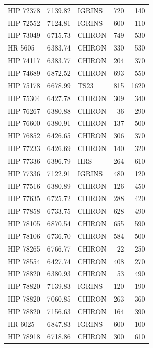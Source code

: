 {\begin{scriptsize}
\begin{longtable}{|l|rlrr|}
   HIP 72378 &  7139.82 &     IGRINS &      720 &   140 \\
   HIP 72552 &  7124.81 &     IGRINS &      600 &   110 \\
   HIP 73049 &  6715.73 &     CHIRON &      749 &   530 \\
     HR 5605 &  6383.74 &     CHIRON &      330 &   530 \\
   HIP 74117 &  6383.77 &     CHIRON &      204 &   370 \\
   HIP 74689 &  6872.52 &     CHIRON &      693 &   550 \\
   HIP 75178 &  6678.99 &       TS23 &      815 &  1620 \\
   HIP 75304 &  6427.78 &     CHIRON &      309 &   340 \\
   HIP 76267 &  6380.88 &     CHIRON &       36 &   290 \\
   HIP 76600 &  6380.91 &     CHIRON &      137 &   500 \\
   HIP 76852 &  6426.65 &     CHIRON &      306 &   370 \\
   HIP 77233 &  6426.69 &     CHIRON &      140 &   320 \\
   HIP 77336 &  6396.79 &        HRS &      264 &   610 \\
   HIP 77336 &  7122.91 &     IGRINS &      480 &   120 \\
   HIP 77516 &  6380.89 &     CHIRON &      126 &   450 \\
   HIP 77635 &  6725.72 &     CHIRON &      288 &   420 \\
   HIP 77858 &  6733.75 &     CHIRON &      628 &   490 \\
   HIP 78105 &  6870.54 &     CHIRON &      655 &   590 \\
   HIP 78106 &  6736.70 &     CHIRON &      584 &   500 \\
   HIP 78265 &  6766.77 &     CHIRON &       22 &   250 \\
   HIP 78554 &  6427.74 &     CHIRON &      408 &   270 \\
   HIP 78820 &  6380.93 &     CHIRON &       53 &   490 \\
   HIP 78820 &  7139.83 &     IGRINS &      120 &   190 \\
   HIP 78820 &  7060.85 &     CHIRON &      263 &   360 \\
   HIP 78820 &  7156.63 &     CHIRON &      164 &   390 \\
     HR 6025 &  6847.83 &     IGRINS &      600 &   100 \\
   HIP 78918 &  6718.86 &     CHIRON &      300 &   610 \\

\end{longtable}
\end{scriptsize}}
